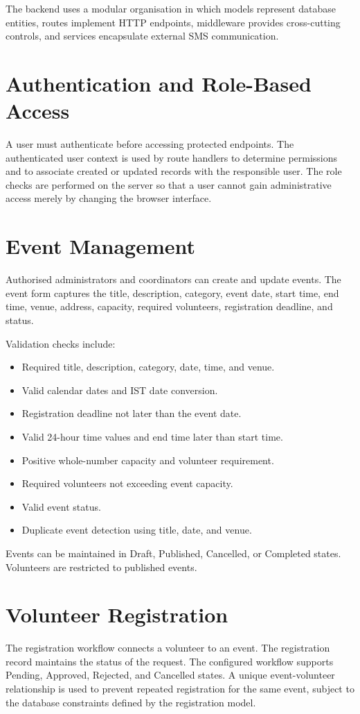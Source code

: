 \documentclass[12pt,a4paper,oneside]{report}
\begin{document}
The backend uses a modular organisation in which models represent database entities, routes implement HTTP endpoints, middleware provides cross-cutting controls, and services encapsulate external SMS communication.

\section{Authentication and Role-Based Access}
A user must authenticate before accessing protected endpoints. The authenticated user context is used by route handlers to determine permissions and to associate created or updated records with the responsible user. The role checks are performed on the server so that a user cannot gain administrative access merely by changing the browser interface.

\section{Event Management}
Authorised administrators and coordinators can create and update events. The event form captures the title, description, category, event date, start time, end time, venue, address, capacity, required volunteers, registration deadline, and status.

Validation checks include:
\begin{itemize}
  \item Required title, description, category, date, time, and venue.
  \item Valid calendar dates and IST date conversion.
  \item Registration deadline not later than the event date.
  \item Valid 24-hour time values and end time later than start time.
  \item Positive whole-number capacity and volunteer requirement.
  \item Required volunteers not exceeding event capacity.
  \item Valid event status.
  \item Duplicate event detection using title, date, and venue.
\end{itemize}

Events can be maintained in Draft, Published, Cancelled, or Completed states. Volunteers are restricted to published events.

\section{Volunteer Registration}
The registration workflow connects a volunteer to an event. The registration record maintains the status of the request. The configured workflow supports Pending, Approved, Rejected, and Cancelled states. A unique event-volunteer relationship is used to prevent repeated registration for the same event, subject to the database constraints defined by the registration model.
\end{document}
